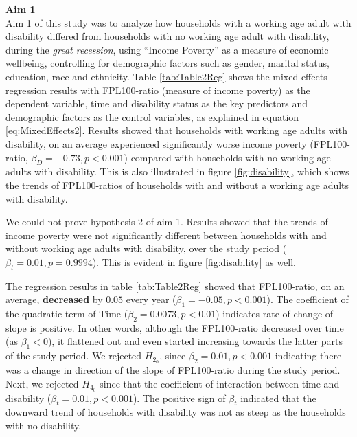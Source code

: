 \documentclass[11pt]{extarticle} %
\begin{document}
\noindent
{\bf{Aim 1}}\\
Aim 1 of this study was to analyze how households with a working age adult with disability differed from households with no working age adult with disability, during the {\emph{great recession}}, using ``Income Poverty'' as a measure of economic wellbeing, controlling for demographic factors such as gender, marital status, education, race and ethnicity. Table \ref{tab:Table2Reg} shows the mixed-effects regression results with FPL100-ratio (measure of income poverty) as the dependent variable, time and disability status as the key predictors and demographic factors as the control variables, as explained in equation \ref{eq:MixedEffects2}. Results showed that households with working age adults with disability, on an average experienced significantly worse income poverty (FPL100-ratio, $\beta_D = -0.73, p < 0.001$) compared with households with no working age adults with disability. This is also illustrated in figure \ref{fig:disability}, which shows the trends of FPL100-ratios of households with and without a working age adults with disability. 

We could not prove hypothesis 2 of aim 1. Results showed that the trends of income poverty were not significantly different between households with and without working age adults with disability, over the study period ($\beta_t = 0.01, p = 0.9994$). This is evident in figure \ref{fig:disability} as well. 

The regression results in table \ref{tab:Table2Reg} showed that FPL100-ratio, on an average, {\bf{decreased}} by $0.05$ every year ($\beta_1 = -0.05, p < 0.001$). The coefficient of the quadratic term of Time ($\beta_2 = 0.0073, p < 0.01$) indicates rate of change of slope is positive. In other words, although the FPL100-ratio decreased over time (as $\beta_1 < 0$), it flattened out and even started increasing towards the latter parts of the study period. We rejected $H_{2_0}$, since $\beta_2 = 0.01, p < 0.001$ indicating there was a change in direction of the slope of FPL100-ratio during the study period. Next, we rejected $H_{4_0}$ since  that the coefficient of interaction between time and disability ($\beta_t = 0.01, p < 0.001$). The positive sign of $\beta_t$ indicated that the downward trend of households with disability was not as steep as the households with no disability.
\end{document}

